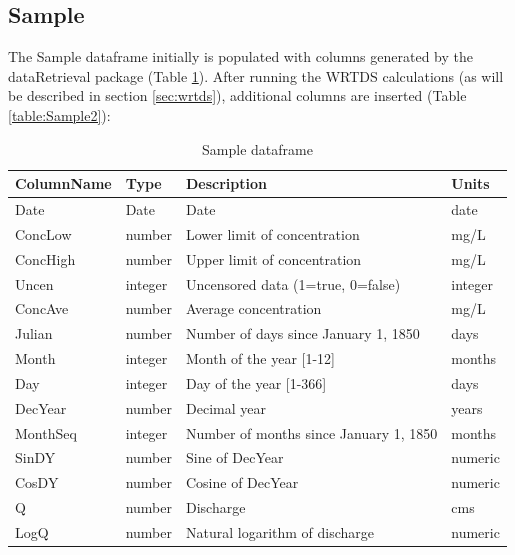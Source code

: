 \documentclass[a4paper,11pt]{article}\usepackage[]{graphicx}\usepackage[]{color}
\begin{document}
\FloatBarrier
\pagebreak


\subsection{Sample}
\label{sec:dataframesSample}
The Sample dataframe initially is populated with columns generated by the dataRetrieval package (Table \ref{table:Sample1}). After running the WRTDS calculations (as will be described in section \ref{sec:wrtds}), additional columns are inserted (Table \ref{table:Sample2}):

\begin{table}[!ht]
\begin{minipage}{\linewidth}
\centering
\caption{Sample dataframe} 
\label{table:Sample1}
\begin{tabular}{llll}
  \hline
ColumnName & Type & Description & Units \\ 
  \hline
Date & Date & Date & date \\ 
  ConcLow & number & Lower limit of concentration & mg/L \\ 
  ConcHigh & number & Upper limit of concentration & mg/L \\ 
  Uncen & integer & Uncensored data (1=true, 0=false) & integer \\ 
  ConcAve & number & Average concentration & mg/L \\ 
  Julian & number & Number of days since January 1, 1850 & days \\ 
  Month & integer & Month of the year [1-12] & months \\ 
  Day & integer & Day of the year [1-366] & days \\ 
  DecYear & number & Decimal year & years \\ 
  MonthSeq & integer & Number of months since January 1, 1850 & months \\ 
  SinDY & number & Sine of DecYear & numeric \\ 
  CosDY & number & Cosine of DecYear & numeric \\ 
  Q \footnotemark[1] & number & Discharge & cms \\ 
  LogQ \footnotemark[1] & number & Natural logarithm of discharge & numeric \\ 
   \hline
\end{tabular}
\end{minipage}
\end{table}
\end{document}
